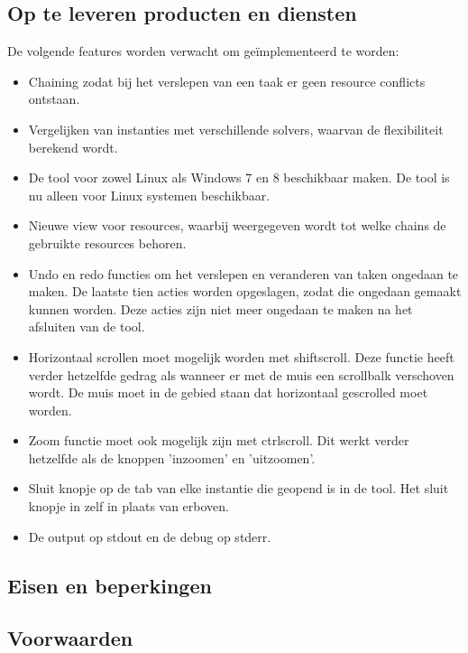 \subsection{Op te leveren producten en diensten}
De volgende features worden verwacht om ge\"implementeerd te worden:
\begin{itemize}
	\item Chaining zodat bij het verslepen van een taak er geen resource conflicts ontstaan.
	\item Vergelijken van instanties met verschillende solvers, waarvan de flexibiliteit berekend wordt.
	\item De tool voor zowel Linux als Windows 7 en 8 beschikbaar maken. De tool is nu alleen voor Linux systemen beschikbaar. 
	\item Nieuwe view voor resources, waarbij weergegeven wordt tot welke chains de gebruikte resources behoren.
	\item Undo en redo functies om het verslepen en veranderen van taken ongedaan te maken. De laatste tien acties worden opgeslagen, zodat die ongedaan gemaakt kunnen worden. Deze acties zijn niet meer ongedaan te maken na het afsluiten van de tool. 
	\item Horizontaal scrollen moet mogelijk worden met shift\plus scroll. Deze functie heeft verder hetzelfde gedrag als wanneer er met de muis een scrollbalk verschoven wordt. De muis moet in de gebied staan dat horizontaal gescrolled moet worden. 
	\item Zoom functie moet ook mogelijk zijn met ctrl\plus scroll. Dit werkt verder hetzelfde als de knoppen 'inzoomen' en 'uitzoomen'.
	\item Sluit knopje op de tab van elke instantie die geopend is in de tool. Het sluit knopje in  zelf in plaats van erboven.
	\item De output op stdout en de debug op stderr.
\end{itemize}

\subsection{Eisen en beperkingen}
\subsection{Voorwaarden}
